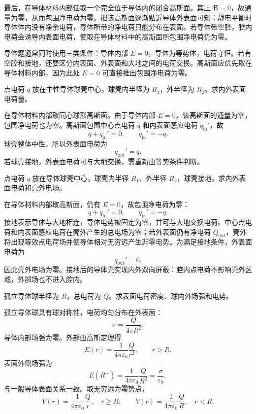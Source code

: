 最后，在导体材料内部任取一个完全位于导体内的闭合高斯面。其上 $\bm E=0$，故通量为零，从而包围净电荷为零。把该高斯面逐渐贴近导体外表面可知：静电平衡时导体体内没有净余电荷，导体所带的净电荷只能分布在表面。若导体带空腔，腔内电荷会诱导内表面电荷，使取在导体材料中的高斯面所包围净电荷仍为零。

\begin{method}[含导体静电题的基本方程]
导体题通常同时使用三类条件：导体内部 $E=0$，导体为等势体，电荷守恒。若有空腔和接地，还要区分内表面、外表面和大地之间的电荷交换。高斯面应优先取在导体材料内部，因为此处 $E=0$ 可直接推出包围净电荷为零。
\end{method}

\begin{example}[title={中心点电荷与中性导体球壳}]\label{eg:shell-charge}
点电荷 $q$ 放在中性导体球壳中心，球壳内半径为 $R_1$，外半径为 $R_2$。求内外表面电荷量。
\begin{solution}
在导体材料内部取同心球形高斯面。由于导体内部 $E=0$，该高斯面的通量为零，包围净电荷也为零。高斯面包围中心点电荷 $q$ 和内表面感应电荷 $q_{\mathrm{in}}'$，故
\[
  q+q_{\mathrm{in}}'=0,\qquad q_{\mathrm{in}}'=-q.
\]
球壳整体中性，所以外表面电荷为
\[
  q_{\mathrm{out}}'=q.
\]
若球壳接地，外表面电荷可与大地交换，需重新由等势条件判断。
\end{solution}
\end{example}

\begin{example}[title={接地导体球壳中心有点电荷}]\label{eg:grounded-shell}
点电荷 $q$ 放在导体球壳中心，球壳内半径 $R_1$、外半径 $R_2$，球壳接地。求内外表面电荷和壳外电场。
\begin{solution}
在导体材料内部取高斯面，仍有 $E=0$，故包围净电荷为零：
\[
  q+q_{\mathrm{in}}'=0,\qquad q_{\mathrm{in}}'=-q.
\]
接地表示导体与大地相连，导体电势被固定为零，并可与大地交换电荷。中心点电荷和内表面感应电荷在壳外产生的总电场为零；若外表面仍有净电荷 $Q_{\mathrm{out}}$，壳外将出现等效点电荷场并使导体相对无穷远产生非零电势。为满足接地条件，外表面电荷为
\[
  q_{\mathrm{out}}'=0.
\]
因此壳外电场为零。接地后的导体壳实现内外双向屏蔽：腔内点电荷不影响壳外区域，外部场也不进入腔内。
\end{solution}
\end{example}

\begin{example}[title={带电导体球的表面电荷密度与表面场强}]\label{eg:conducting-sphere}
孤立导体球半径为 $R$，总电荷为 $Q$。求表面电荷密度、球内外场强和电势。
\begin{solution}
孤立导体球具有球对称性，电荷均匀分布在外表面：
\[
  \sigma=\frac{Q}{4\pi R^2}.
\]
导体内部场强为零。外部由高斯定理得
\[
  E(r)=\frac{1}{4\pi\varepsilon_0}\frac{Q}{r^2},\qquad r>R.
\]
表面外侧场强为
\[
  E(R^+)=\frac{1}{4\pi\varepsilon_0}\frac{Q}{R^2}=\frac{\sigma}{\varepsilon_0},
\]
与一般导体表面关系一致。取无穷远为零势点，
\[
  V(r)=\frac{1}{4\pi\varepsilon_0}\frac{Q}{r},\quad r\ge R;\qquad
  V(r)=\frac{1}{4\pi\varepsilon_0}\frac{Q}{R},\quad r<R.
\]
\end{solution}
\end{example}


